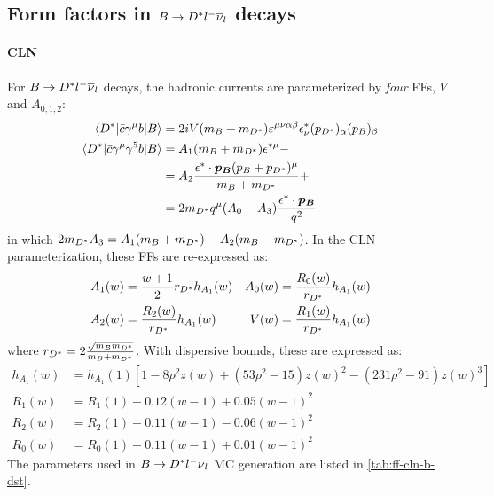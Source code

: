 \subsection{Form factors in $B \rightarrow {\ensuremath{{D}^*}}{\ensuremath{l^-}}{\ensuremath{{\overline{\nu}}_l}}$ decays}
\label{ref:theory:ff-dst}

\paragraph{CLN}
For $B \rightarrow {\ensuremath{{D}^*}}{\ensuremath{l^-}}{\ensuremath{{\overline{\nu}}_l}}$ decays,
the hadronic currents are parameterized by \emph{four} FFs,
$V$ and $A_{0,1,2}$:
\begin{align}
    \langle{\ensuremath{{D}^*}}\rvert \bar{c} \gamma^\mu b \lvert B\rangle
    =\hphantom{ } &
        2i V (m_B + m_{{D}^*}) \varepsilon^{\mu\nu\alpha\beta}
        \epsilon^*_\nu (p_{{D}^*})_\alpha (p_B)_\beta \\
    \langle{\ensuremath{{D}^*}}\rvert \bar{c} \gamma^\mu \gamma^5 b \lvert B\rangle
    =\hphantom{ } &
        A_1 (m_B + m_{{D}^*}) \epsilon^{*\mu} -
        \nonumber \\
    =\hphantom{ } &
        A_2 \frac{\epsilon^* \cdot \bm{p_B} (p_B + p_{{D}^*})^\mu}{m_B + m_{{D}^*}} +
        \nonumber \\
    =\hphantom{ } &
        2 m_{{D}^*} q^\mu (A_0 - A_3) \frac{\epsilon^* \cdot \bm{p_B}}{q^2}
\end{align}
in which $2 m_{{D}^*} A_3 = A_1(m_B + m_{{D}^*}) - A_2(m_B - m_{{D}^*})$.
In the CLN parameterization,
these FFs are re-expressed as:
\begin{align}
    & A_1(w) = \frac{w+1}{2} r_{{D}^*} h_{A_1}(w)
    & A_0(w) = \frac{R_0(w)}{r_{{D}^*}} h_{A_1}(w)
    \label{eqn:b-dst-ff-param-1} \\
    & A_2(w) = \frac{R_2(w)}{r_{{D}^*}} h_{A_1}(w)
    & V(w) = \frac{R_1(w)}{r_{{D}^*}} h_{A_1}(w)
    \label{eqn:b-dst-ff-param-2}
\end{align}
where $r_{{D}^*} = 2 \frac{\sqrt{m_B m_{{D}^*}}}{m_B + m_{{D}^*}}$.
With dispersive bounds, these are expressed as:
\begin{align}
    h_{A_1}(w) &= h_{A_1}(1) \left[
        1 - 8 \rho^2 z(w) + (53 \rho^2 - 15) z(w)^2 - (231 \rho^2 - 91) z(w)^3
    \right] \label{eqn:cln-dst-bad-correlation} \\
        R_1(w) &= R_1(1) - 0.12(w-1) + 0.05(w-1)^2
        \label{eqn:cln-dst-bad-coeff-1} \\
    R_2(w) &= R_2(1) + 0.11(w-1) - 0.06(w-1)^2
        \label{eqn:cln-dst-bad-coeff-2} \\
    R_0(w) &= R_0(1) - 0.11(w-1) + 0.01(w-1)^2
        \label{eqn:cln-dst-bad-coeff-3}
\end{align}
The parameters used in $B \rightarrow {\ensuremath{{D}^*}}{\ensuremath{l^-}}{\ensuremath{{\overline{\nu}}_l}}$ MC generation are
listed in \cref{tab:ff-cln-b-dst}.


